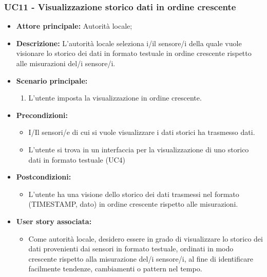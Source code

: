 \documentclass{article}
\begin{document}
\subsubsection{UC11 - Visualizzazione storico dati in ordine crescente}
\begin{itemize}
    \item \textbf{Attore principale:} Autorità locale;
    \item \textbf{Descrizione:} L’autorità locale seleziona i/il sensore/i della quale vuole visionare lo storico dei dati in formato testuale in ordine crescente rispetto alle misurazioni del/i sensore/i.
    \item \textbf{Scenario principale:}
          \begin{enumerate}
              \item L'utente imposta la visualizzazione in ordine crescente.
          \end{enumerate}
    \item \textbf{Precondizioni:}
          \begin{itemize}
              \item  I/Il sensori/e di cui si vuole visualizzare i dati storici ha trasmesso dati.
              \item  L'utente si trova in un interfaccia per la visualizzazione di uno storico dati in formato testuale (UC4)
          \end{itemize}
    \item \textbf{Postcondizioni:}
          \begin{itemize}
              \item  L'utente ha una visione dello storico dei dati trasmessi nel formato (TIMESTAMP, dato) in ordine crescente rispetto alle misurazioni.
          \end{itemize}
    \item \textbf{User story associata:}
          \begin{itemize}
              \item Come autorità locale, desidero essere in grado di visualizzare lo storico dei dati provenienti dai sensori in formato testuale, ordinati in modo crescente rispetto alla misurazione del/i sensore/i, al fine di identificare facilmente tendenze, cambiamenti o pattern nel tempo.
          \end{itemize}
\end{itemize}
\end{document}
